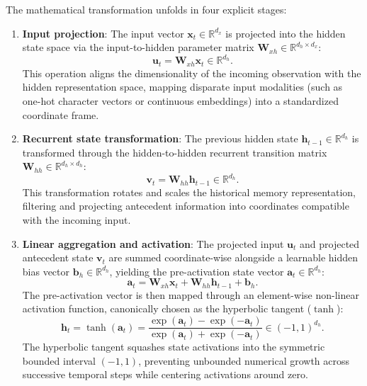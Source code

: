 \documentclass[../../../main.tex]{subfiles}
\begin{document}
The mathematical transformation unfolds in four explicit stages:
\begin{enumerate}
    \item \textbf{Input projection}: The input vector $\mathbf{x}_t \in \mathbb{R}^{d_x}$ is projected into the hidden state space via the input-to-hidden parameter matrix $\mathbf{W}_{xh} \in \mathbb{R}^{d_h \times d_x}$:
    \begin{equation}
    \mathbf{u}_t = \mathbf{W}_{xh} \mathbf{x}_t \in \mathbb{R}^{d_h}.
    \end{equation}
    This operation aligns the dimensionality of the incoming observation with the hidden representation space, mapping disparate input modalities (such as one-hot character vectors or continuous embeddings) into a standardized coordinate frame.
    
    \item \textbf{Recurrent state transformation}: The previous hidden state $\mathbf{h}_{t-1} \in \mathbb{R}^{d_h}$ is transformed through the hidden-to-hidden recurrent transition matrix $\mathbf{W}_{hh} \in \mathbb{R}^{d_h \times d_h}$:
    \begin{equation}
    \mathbf{v}_t = \mathbf{W}_{hh} \mathbf{h}_{t-1} \in \mathbb{R}^{d_h}.
    \end{equation}
    This transformation rotates and scales the historical memory representation, filtering and projecting antecedent information into coordinates compatible with the incoming input.
    
    \item \textbf{Linear aggregation and activation}: The projected input $\mathbf{u}_t$ and projected antecedent state $\mathbf{v}_t$ are summed coordinate-wise alongside a learnable hidden bias vector $\mathbf{b}_h \in \mathbb{R}^{d_h}$, yielding the pre-activation state vector $\mathbf{a}_t \in \mathbb{R}^{d_h}$:
    \begin{equation}
    \mathbf{a}_t = \mathbf{W}_{xh} \mathbf{x}_t + \mathbf{W}_{hh} \mathbf{h}_{t-1} + \mathbf{b}_h.
    \label{eq:rnn_preactivation}
    \end{equation}
    The pre-activation vector is then mapped through an element-wise non-linear activation function, canonically chosen as the hyperbolic tangent ($\tanh$):
    \begin{equation}
    \mathbf{h}_t = \tanh\left(\mathbf{a}_t\right) = \frac{\exp\left(\mathbf{a}_t\right) - \exp\left(-\mathbf{a}_t\right)}{\exp\left(\mathbf{a}_t\right) + \exp\left(-\mathbf{a}_t\right)} \in (-1, 1)^{d_h}.
    \label{eq:rnn_hidden_state}
    \end{equation}
    The hyperbolic tangent squashes state activations into the symmetric bounded interval $(-1, 1)$, preventing unbounded numerical growth across successive temporal steps while centering activations around zero.
    

\end{enumerate}
\end{document}
